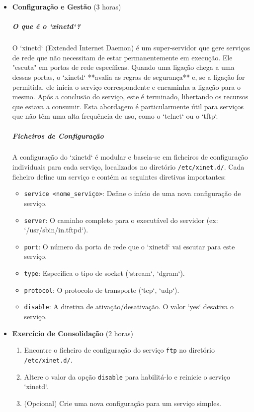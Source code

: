 \documentclass[10pt,a4paper]{article}
\begin{document}
	\begin{itemize}
		\item \textbf{Configuração e Gestão} (3 horas)
		\subparagraph{O que é o `xinetd`?} O `xinetd` (Extended Internet Daemon) é um super-servidor que gere serviços de rede que não necessitam de estar permanentemente em execução. Ele "escuta" em portas de rede específicas. Quando uma ligação chega a uma dessas portas, o `xinetd` **avalia as regras de segurança** e, se a ligação for permitida, ele inicia o serviço correspondente e encaminha a ligação para o mesmo. Após a conclusão do serviço, este é terminado, libertando os recursos que estava a consumir. Esta abordagem é particularmente útil para serviços que não têm uma alta frequência de uso, como o `telnet` ou o `tftp`.
		
		\subparagraph{Ficheiros de Configuração} A configuração do `xinetd` é modular e baseia-se em ficheiros de configuração individuais para cada serviço, localizados no diretório \texttt{/etc/xinet.d/}. Cada ficheiro define um serviço e contém as seguintes diretivas importantes:
		\begin{itemize}
			\item \texttt{service <nome\_serviço>}: Define o início de uma nova configuração de serviço.
			\item \texttt{server}: O caminho completo para o executável do servidor (ex: `/usr/sbin/in.tftpd`).
			\item \texttt{port}: O número da porta de rede que o `xinetd` vai escutar para este serviço.
			\item \texttt{type}: Especifica o tipo de socket (`stream`, `dgram`).
			\item \texttt{protocol}: O protocolo de transporte (`tcp`, `udp`).
			\item \texttt{disable}: A diretiva de ativação/desativação. O valor `yes` desativa o serviço.
		\end{itemize}
		
		\item \textbf{Exercício de Consolidação} (2 horas)
		\begin{enumerate}
			\item Encontre o ficheiro de configuração do serviço \texttt{ftp} no diretório \texttt{/etc/xinet.d/}.
			\item Altere o valor da opção \texttt{disable} para habilitá-lo e reinicie o serviço `xinetd`.
			\item (Opcional) Crie uma nova configuração para um serviço simples.
		\end{enumerate}
	\end{itemize}
	
\end{document}

